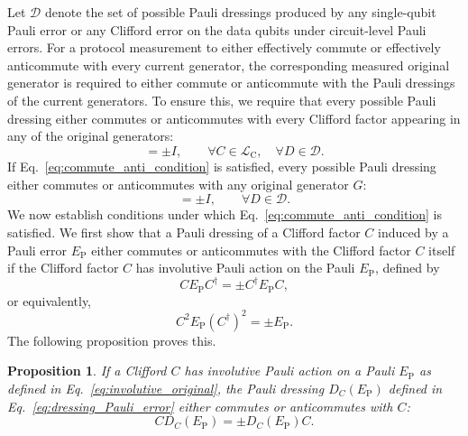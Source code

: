 \documentclass[
 reprint,
 amsmath,amssymb,
 pra,superscriptaddress, nofootinbib
]{revtex4-2}
\newtheorem{proposition}{Proposition}
\theoremstyle{definition}
\theoremstyle{plain}
\begin{document}
Let $\mathcal D$ denote the set of possible Pauli dressings produced by any single-qubit Pauli error or any Clifford error on the data qubits under circuit-level Pauli errors.
For a protocol measurement to either effectively commute or effectively anticommute with every current generator, the corresponding measured original generator is required to either commute or anticommute with the Pauli dressings of the current generators.
To ensure this, we require that every possible Pauli dressing either commutes or anticommutes with every Clifford factor appearing in any of the original generators:
\begin{equation}
  [C,D]=\pm I, \qquad \forall C\in\mathcal{L}_\mathrm{C}, \quad \forall D\in\mathcal{D}.
  \label{eq:commute_anti_condition}
\end{equation} 
If Eq.~\eqref{eq:commute_anti_condition} is satisfied, every possible Pauli dressing either commutes or anticommutes with any original generator $G$:
\begin{equation}
  [G,D]=\pm I, \qquad  \forall D\in\mathcal{D}.
  \label{eq:commute_anti_condition_stab}
\end{equation} 
We now establish conditions under which Eq.~\eqref{eq:commute_anti_condition} is satisfied.
We first show that a Pauli dressing of a Clifford factor $C$ induced by a Pauli error $E_\mathrm{P}$ either commutes or anticommutes with the Clifford factor $C$ itself if the Clifford factor $C$ has involutive Pauli action on the Pauli $E_\mathrm{P}$, defined by
\begin{equation}
  C E_\mathrm{P} C^\dagger=\pm C^\dagger E_\mathrm{P} C,
  \label{eq:involutive_original}
\end{equation}
or equivalently, 
\begin{equation}
  C^2 E_\mathrm{P} (C^\dagger)^2=\pm E_\mathrm{P}.
  \label{eq:involutive}
\end{equation}
The following proposition proves this. 

\begin{proposition}
If a Clifford $C$ has involutive Pauli action on a Pauli $E_\mathrm{P}$ as defined in Eq.~\eqref{eq:involutive_original}, the Pauli dressing $D_C(E_\mathrm{P})$ defined in Eq.~\eqref{eq:dressing_Pauli_error} either commutes or anticommutes with $C$:
\begin{equation}
  C D_C(E_\mathrm{P})=\pm D_C(E_\mathrm{P}) C .
\end{equation}
\end{proposition}
\end{document}

